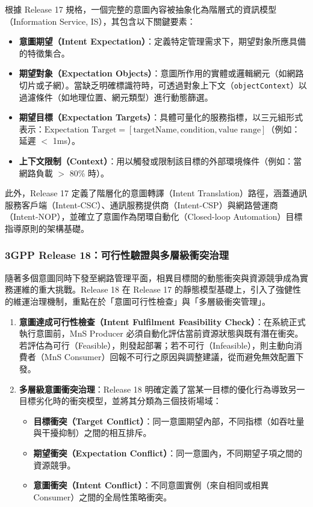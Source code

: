 根據 Release 17 規格，一個完整的意圖內容被抽象化為階層式的資訊模型（Information Service, IS），其包含以下關鍵要素：
\begin{itemize}
    \item \textbf{意圖期望（Intent Expectation）}：定義特定管理需求下，期望對象所應具備的特徵集合。
    \item \textbf{期望對象（Expectation Objects）}：意圖所作用的實體或邏輯網元（如網路切片或子網）。當缺乏明確標識符時，可透過對象上下文（\texttt{objectContext}）以過濾條件（如地理位置、網元類型）進行動態篩選。
    \item \textbf{期望目標（Expectation Targets）}：具體可量化的服務指標，以三元組形式表示：$\text{Expectation Target} = [\text{targetName}, \text{condition}, \text{value range}]$（例如：延遲 $<$ 1ms）。
    \item \textbf{上下文限制（Context）}：用以觸發或限制該目標的外部環境條件（例如：當網路負載 $>$ 80\% 時）。
\end{itemize}

此外，Release 17 定義了階層化的意圖轉譯（Intent Translation）路徑，涵蓋通訊服務客戶端（Intent-CSC）、通訊服務提供商（Intent-CSP）與網路營運商（Intent-NOP），並確立了意圖作為閉環自動化（Closed-loop Automation）目標指導原則的架構基礎。

\subsubsection{3GPP Release 18：可行性驗證與多層級衝突治理}

隨著多個意圖同時下發至網路管理平面，相異目標間的動態衝突與資源競爭成為實務運維的重大挑戰。Release 18 在 Release 17 的靜態模型基礎上，引入了強健性的維運治理機制，重點在於「意圖可行性檢查」與「多層級衝突管理」。

\begin{enumerate}
    \item \textbf{意圖達成可行性檢查（Intent Fulfilment Feasibility Check）}：在系統正式執行意圖前，MnS Producer 必須自動化評估當前資源狀態與既有潛在衝突。若評估為可行（Feasible），則發起部署；若不可行（Infeasible），則主動向消費者（MnS Consumer）回報不可行之原因與調整建議，從而避免無效配置下發。
    \item \textbf{多層級意圖衝突治理}：Release 18 明確定義了當某一目標的優化行為導致另一目標劣化時的衝突模型，並將其分類為三個技術場域：
    \begin{itemize}
        \item \textbf{目標衝突（Target Conflict）}：同一意圖期望內部，不同指標（如吞吐量與干擾抑制）之間的相互排斥。
        \item \textbf{期望衝突（Expectation Conflict）}：同一意圖內，不同期望子項之間的資源競爭。
        \item \textbf{意圖衝突（Intent Conflict）}：不同意圖實例（來自相同或相異 Consumer）之間的全局性策略衝突。
    \end{itemize}
\end{enumerate}

